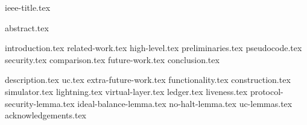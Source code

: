 \documentclass[conference]{IEEEtran}
\begin{document}
{ieee-title.tex}
\maketitle
{abstract.tex}

{introduction.tex}
{related-work.tex}
{high-level.tex}
{preliminaries.tex}
{pseudocode.tex}
{security.tex}
{comparison.tex}
{future-work.tex}
{conclusion.tex}

\newpage
\appendix
{description.tex}
{uc.tex}
{extra-future-work.tex}
{functionality.tex}
{construction.tex}
{simulator.tex}
{lightning.tex}
{virtual-layer.tex}
{ledger.tex}
{liveness.tex}
{protocol-security-lemma.tex}
{ideal-balance-lemma.tex}
{no-halt-lemma.tex}
{uc-lemmas.tex}
{acknowledgements.tex}
\end{document}
